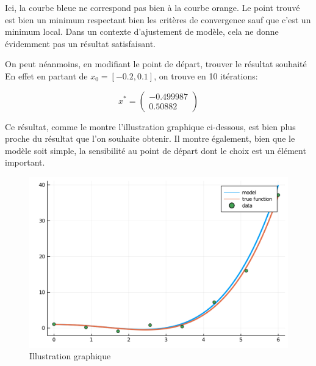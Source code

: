 \documentclass[a4paper,11pt]{article}
\numberwithin{equation}{section}
\begin{document}
Ici, la courbe bleue ne correspond pas bien à la courbe orange. Le point trouvé est bien un minimum respectant bien les critères de convergence sauf que c'est un minimum local. Dans un contexte d'ajustement de modèle, cela ne donne évidemment pas un résultat satisfaisant.

On peut néanmoins, en modifiant le point de départ, trouver le résultat souhaité
En effet en partant de $x_{0} = [-0.2,0.1]$, on trouve en 10 itérations:

$$
 x^{*} = \begin{pmatrix}
-0.499987\\
0.50882
\end{pmatrix}$$

Ce résultat, comme le montre l'illustration graphique ci-dessous, est bien plus proche du résultat que l'on souhaite obtenir. Il montre également, bien que le modèle soit simple, la sensibilité au point de départ dont le choix est un élément important.
\begin{figure}[!h]
\centering
\includegraphics[scale=0.6]{images/courbe3}
\caption{Illustration graphique}
\end{figure}




\end{document}
